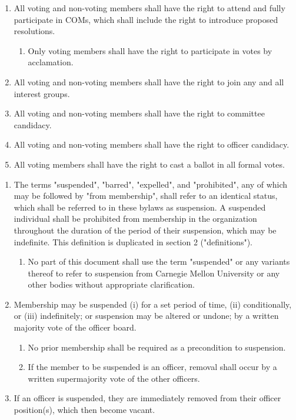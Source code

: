 \documentclass[11pt]{article}
\newcounter{h1}
\newcounter{h2}[h1]
\newcounter{h3}[h2]
\begin{document}
\begin{enumerate}
  \item All voting and non-voting members shall have the right to attend and fully participate in COMs, which shall include the right to introduce proposed resolutions.  
  \begin{enumerate}
    \item Only voting members shall have the right to participate in votes by acclamation.  
  \end{enumerate}
  \item All voting and non-voting members shall have the right to join any and all interest groups.  
  \item All voting and non-voting members shall have the right to committee candidacy.  
  \item All voting and non-voting members shall have the right to officer candidacy.  
  \item All voting members shall have the right to cast a ballot in all formal votes.
\end{enumerate}


\begin{enumerate}
  \item The terms "suspended", "barred", "expelled", and "prohibited", any of which may be followed by "from membership", shall refer to an identical status, which shall be referred to in these bylaws as suspension. A suspended individual shall be prohibited from membership in the organization throughout the duration of the period of their suspension, which may be indefinite. This definition is duplicated in section 2 ("definitions").  
  \begin{enumerate}
    \item No part of this document shall use the term "suspended" or any variants thereof to refer to suspension from Carnegie Mellon University or any other bodies without appropriate clarification.  
  \end{enumerate}
  \item Membership may be suspended (i) for a set period of time, (ii) conditionally, or (iii) indefinitely; or suspension may be altered or undone; by a written majority vote of the officer board.  
  \begin{enumerate}
    \item No prior membership shall be required as a precondition to suspension.  
    \item If the member to be suspended is an officer, removal shall occur by a written supermajority vote of the other officers.  
  \end{enumerate}
  \item If an officer is suspended, they are immediately removed from their officer position(s), which then become vacant.
\end{enumerate}
\end{document}
